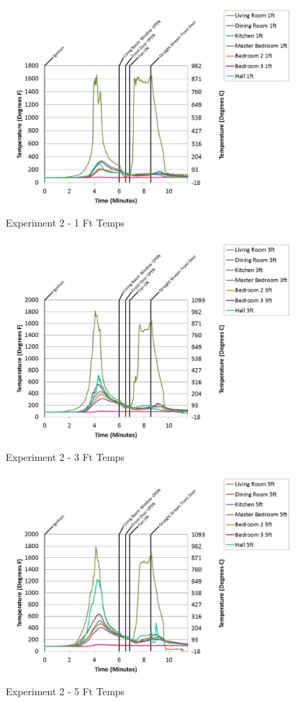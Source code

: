 \documentclass{article}
\begin{document}
\begin{appendices}
	\begin{figure}[h!]
		\centering
		\includegraphics[height=3.05in]{0_Images/Results_Charts/Exp_2_Charts/1FtTemps.pdf}
		\caption{Experiment 2 - 1 Ft Temps}
	\end{figure}
 

	\begin{figure}[h!]
		\centering
		\includegraphics[height=3.05in]{0_Images/Results_Charts/Exp_2_Charts/3FtTemps.pdf}
		\caption{Experiment 2 - 3 Ft Temps}
	\end{figure}
 
	\clearpage

	\begin{figure}[h!]
		\centering
		\includegraphics[height=3.05in]{0_Images/Results_Charts/Exp_2_Charts/5FtTemps.pdf}
		\caption{Experiment 2 - 5 Ft Temps}
	\end{figure}
 


\end{appendices}
\end{document}
